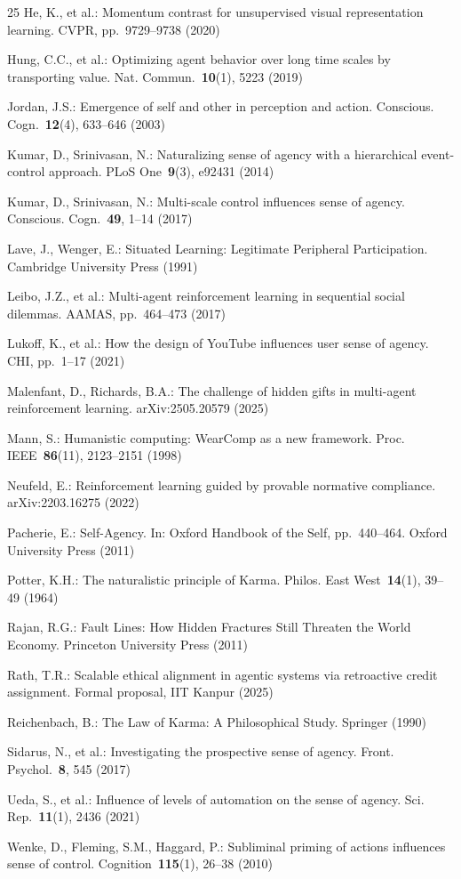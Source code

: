 \documentclass[runningheads]{llncs}
\begin{document}
\begin{thebibliography}{25}
He, K., et al.:
Momentum contrast for unsupervised visual representation learning.
CVPR, pp.~9729--9738 (2020)

Hung, C.C., et al.:
Optimizing agent behavior over long time scales by transporting value.
Nat. Commun.~\textbf{10}(1), 5223 (2019)

Jordan, J.S.:
Emergence of self and other in perception and action.
Conscious. Cogn.~\textbf{12}(4), 633--646 (2003)

Kumar, D., Srinivasan, N.:
Naturalizing sense of agency with a hierarchical event-control approach.
PLoS One~\textbf{9}(3), e92431 (2014)

Kumar, D., Srinivasan, N.:
Multi-scale control influences sense of agency.
Conscious. Cogn.~\textbf{49}, 1--14 (2017)

Lave, J., Wenger, E.:
Situated Learning: Legitimate Peripheral Participation.
Cambridge University Press (1991)

Leibo, J.Z., et al.:
Multi-agent reinforcement learning in sequential social dilemmas.
AAMAS, pp.~464--473 (2017)

Lukoff, K., et al.:
How the design of YouTube influences user sense of agency.
CHI, pp.~1--17 (2021)

Malenfant, D., Richards, B.A.:
The challenge of hidden gifts in multi-agent reinforcement learning.
arXiv:2505.20579 (2025)

Mann, S.:
Humanistic computing: WearComp as a new framework.
Proc. IEEE~\textbf{86}(11), 2123--2151 (1998)

Neufeld, E.:
Reinforcement learning guided by provable normative compliance.
arXiv:2203.16275 (2022)

Pacherie, E.:
Self-Agency.
In: Oxford Handbook of the Self, pp.~440--464.
Oxford University Press (2011)

Potter, K.H.:
The naturalistic principle of Karma.
Philos. East West~\textbf{14}(1), 39--49 (1964)

Rajan, R.G.:
Fault Lines: How Hidden Fractures Still Threaten the World Economy.
Princeton University Press (2011)

Rath, T.R.:
Scalable ethical alignment in agentic systems via retroactive
credit assignment. Formal proposal, IIT Kanpur (2025)

Reichenbach, B.:
The Law of Karma: A Philosophical Study.
Springer (1990)

Sidarus, N., et al.:
Investigating the prospective sense of agency.
Front. Psychol.~\textbf{8}, 545 (2017)

Ueda, S., et al.:
Influence of levels of automation on the sense of agency.
Sci. Rep.~\textbf{11}(1), 2436 (2021)

Wenke, D., Fleming, S.M., Haggard, P.:
Subliminal priming of actions influences sense of control.
Cognition~\textbf{115}(1), 26--38 (2010)

\end{thebibliography}
\end{document}
